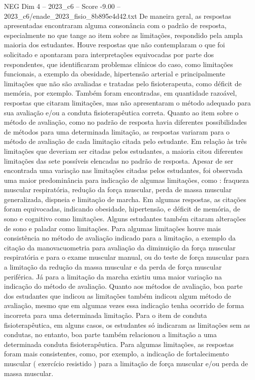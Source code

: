 \begin{textsample}{NEG Dim 4 – 2023\_c6 – Score -9.00 – 2023\_c6/enade\_2023\_fisio\_8b895e4d42.txt}
De maneira geral, as respostas apresentadas encontraram alguma consonância com o padrão de resposta, especialmente no que tange ao item sobre as limitações, respondido pela ampla maioria dos estudantes.
Houve respostas que não contemplaram o que foi solicitado e apontaram para interpretações equivocadas por parte dos respondentes, que identificaram problemas clínicos do caso, como limitações funcionais, a exemplo da obesidade, hipertensão arterial e principalmente limitações que não são avaliadas e tratadas pelo fisioterapeuta, como déficit de memória, por exemplo.
Também foram encontradas, em quantidade razoável, respostas que citaram limitações, mas não apresentaram o método adequado para sua avaliação e/ou a conduta fisioterapêutica correta.
Quanto ao item sobre o método de avaliação, como no padrão de resposta havia diferentes possibilidades de métodos para uma determinada limitação, as respostas variaram para o método de avaliação de cada limitação citada pelo estudante.
Em relação às três limitações que deveriam ser citadas pelos estudantes, a maioria citou diferentes limitações das sete possíveis elencadas no padrão de resposta.
Apesar de ser encontrada uma variação nas limitações citadas pelos estudantes, foi observada uma maior predominância para indicação de algumas limitações, como : fraqueza muscular respiratória, redução da força muscular, perda de massa muscular generalizada, dispneia e limitação de marcha.
Em algumas respostas, as citações foram equivocadas, indicando obesidade, hipertensão, e déficit de memória, de sono e cognitivo como limitações.
Alguns estudantes também citaram alterações de sono e paladar como limitações.
Para algumas limitações houve mais consistência no método de avaliação indicado para a limitação, a exemplo da citação da manovacuometria para avaliação da diminuição da força muscular respiratória e para o exame muscular manual, ou do teste de força muscular para a limitação da redução da massa muscular e da perda de força muscular periférica.
Já para a limitação da marcha existiu uma maior variação na indicação do método de avaliação.
Quanto aos métodos de avaliação, boa parte dos estudantes que indicou as limitações também indicou algum método de avaliação, mesmo que em algumas vezes essa indicação tenha ocorrido de forma incorreta para uma determinada limitação.
Para o item de conduta fisioterapêutica, em alguns casos, os estudantes só indicaram as limitações sem as condutas, no entanto, boa parte também relacionou a limitação a uma determinada conduta fisioterapêutica.
Para algumas limitações, as respostas foram mais consistentes, como, por exemplo, a indicação de fortalecimento muscular ( exercício resistido ) para a limitação de força muscular e/ou perda de massa muscular.

\end{textsample}

